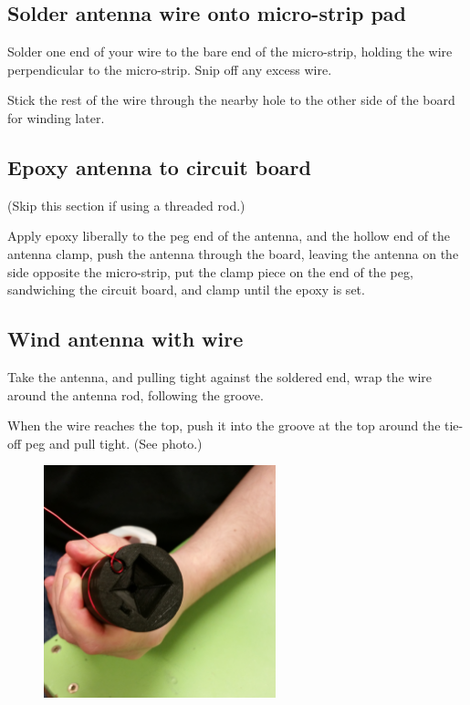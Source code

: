 \documentclass[paper=a4,parskip=full+]{scrartcl}
\begin{document}

\subsection{Solder antenna wire onto micro-strip pad}
Solder one end of your wire to the bare end of the micro-strip, holding the wire perpendicular to the micro-strip. Snip off any excess wire.

Stick the rest of the wire through the nearby hole to the other side of the board for winding later.


\subsection{Epoxy antenna to circuit board}
(Skip this section if using a threaded rod.)

Apply epoxy liberally to the peg end of the antenna, and the hollow end of the antenna clamp, push the antenna through the board, leaving the antenna on the side opposite the micro-strip, put the clamp piece on the end of the peg, sandwiching the circuit board, and clamp until the epoxy is set.


\subsection{Wind antenna with wire}
Take the antenna, and pulling tight against the soldered end, wrap the wire around the antenna rod, following the groove.

When the wire reaches the top, push it into the groove at the top around the tie-off peg and pull tight. (See photo.)

\begin{figure}[H]
    \centering
    \includegraphics[width=0.6\textwidth]{Antenna_Wire_Tieoff.jpg} %
\end{figure}
\end{document}
